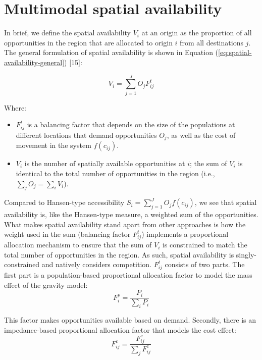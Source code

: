 \documentclass[10pt,letterpaper]{article}
\begin{document}
\hypertarget{multimodal-spatial-availability}{%
\section{Multimodal spatial
availability}\label{multimodal-spatial-availability}}

In brief, we define the spatial availability \(V_{i}\) at an origin as
the proportion of all opportunities in the region that are allocated to
origin \(i\) from all destinations \(j\). The general formulation of
spatial availability is shown in Equation
(\ref{eq:spatial-availability-general}) {[}15{]}:

\begin{equation}
\label{eq:spatial-availability-general}
V_i = \sum_{j=1}^J O_jF^t_{ij}
\end{equation}

\noindent Where:

\begin{itemize}
\item
  \(F^t_{ij}\) is a balancing factor that depends on the size of the
  populations at different locations that demand opportunities \(O_j\),
  as well as the cost of movement in the system \(f(c_{ij})\).
\item
  \(V_i\) is the number of spatially available opportunities at \(i\);
  the sum of \(V_{i}\) is identical to the total number of opportunities
  in the region (i.e., \(\sum_j O_j = \sum_i V_i\)).
\end{itemize}

Compared to Hansen-type accessibility
\(S_i = \sum_{j=1}^J O_jf(c_{ij})\), we see that spatial availability
is, like the Hansen-type measure, a weighted sum of the opportunities.
What makes spatial availability stand apart from other approaches is how
the weight used in the sum (balancing factor \(F^t_{ij}\)) implements a
proportional allocation mechanism to ensure that the sum of \(V_i\) is
constrained to match the total number of opportunities in the region. As
such, spatial availability is singly-constrained and natively considers
competition. \(F^t_{ij}\) consists of two parts. The first part is a
population-based proportional allocation factor to model the mass effect
of the gravity model: \[
F^p_{i} = \frac{P_i}{\sum_i P_i}
\]

This factor makes opportunities available based on demand. Secondly,
there is an impedance-based proportional allocation factor that models
the cost effect: \[
F^c_{ij} = \frac{F^c_{ij}}{\sum_j F^c_{ij}}
\]
\end{document}
